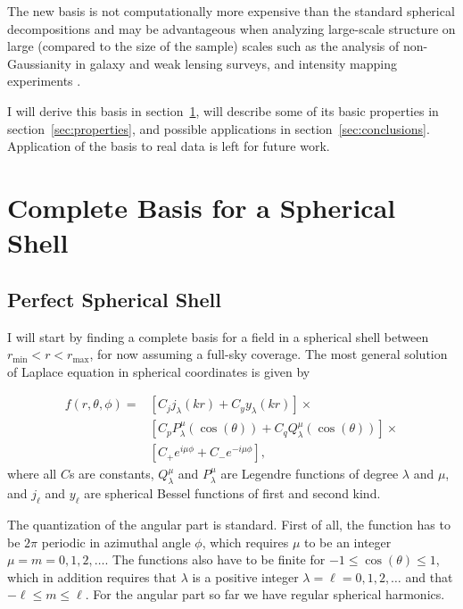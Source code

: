 \documentclass[fleqn,usenatbib]{mnras}
\newcommand{\rmin}{r_\mathrm{min}}
\newcommand{\rmax}{r_\mathrm{max}}
\begin{document}
The new basis is not computationally more expensive than the standard spherical
decompositions and may be advantageous when analyzing large-scale structure on
large (compared to the size of the sample) scales such as the analysis of
non-Gaussianity in galaxy and weak lensing surveys, and intensity mapping
experiments
\citep[e.g.,][]{2019arXiv190508262Y,2016ApJ...833..242L,2014MNRAS.442.1326K}.

I will derive this basis in section~\ref{sec:basis}, will describe some of
its basic properties in section~\ref{sec:properties}, and possible applications
in section~\ref{sec:conclusions}. Application of the basis to real data is left
for future work.

\section{Complete Basis for a Spherical Shell}
\label{sec:basis}

\subsection{Perfect Spherical Shell}
\label{ssec:perfectshell}

I will start by finding a complete basis for a field in a spherical shell
between $\rmin < r < \rmax$, for now assuming a full-sky coverage. The most
general solution of Laplace equation in spherical coordinates is given by

\begin{align} 
\label{eq:generalsol}
f(r,\theta,\phi) = &\left[C_jj_\lambda(kr) + C_yy_\lambda(kr)\right]\times\\
\nonumber
&\left [C_pP^\mu_\lambda (\cos (\theta)) + C_qQ^\mu_\lambda(\cos
(\theta))\right]\times\\
\nonumber
&\left[C_+e^{i\mu\phi} + C_-e^ {-i\mu\phi}\right],
\end{align} 
\noindent
where all $C$s are constants, $Q^\mu_\lambda$ and $P^\mu_\lambda$ are Legendre
functions of degree $\lambda$ and $\mu$, and $j_\ell$ and $y_\ell$ are
spherical Bessel functions of first and second kind.

The quantization of the angular part is standard. First of all, the function
has to be $2\pi$ periodic in azimuthal angle $\phi$, which requires $\mu$ to be
an integer $\mu = m = 0, 1, 2, \ldots$. The functions also have to be finite
for $-1 \leq \cos(\theta) \leq 1$, which in addition requires that $\lambda$ is
a positive integer $\lambda = \ell = 0, 1, 2, \ldots$ and that $-\ell \leq m
\leq \ell$.  For the angular part so far we have regular spherical harmonics.
\end{document}
